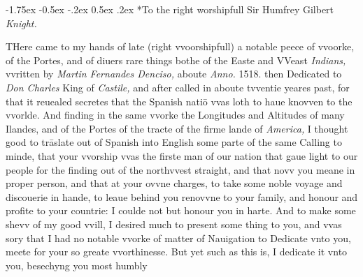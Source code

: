 \documentclass[11pt,twoside]{article}\makeatletter
\makeatletter
\renewcommand\section{\@startsection {section}{1}{\z@}%
     {-1.75ex \@plus -0.5ex \@minus -.2ex}%
     {0.5ex \@plus .2ex}%
     {\reset@font\Large\bfseries\sffamily}}
\makeatother
\begin{document}
\section*{To the right worshipfull Sir Humfrey Gilbert {\itshape Knight.}}\par
THere came to my hands of late (right vvoorshipfull) a notable peece of vvoorke, of the Portes, and of diuers rare things bothe of the Easte and VVeast {\itshape Indians,} vvritten by {\itshape Martin Fer­nandes Denciso,} aboute {\itshape Anno.} 1518. then Dedicated to {\itshape Don Charles} King of {\itshape Castile,} and after called in aboute tvventie yeares past, for that it reuealed secretes that the Spanish natiō vvas loth to haue knovven to the vvorlde. And finding in the same vvorke the Lon­gitudes and Altitudes of many Ilandes, and of the Portes of the tracte of the firme lande of {\itshape America,} I thought good to trāslate out of Spanish into English some parte of the same Calling to minde, that your vvorship vvas the firste man of our nation that gaue light to our people for the finding out of the north­vvest straight, and that novv you meane in proper person, and that at your ovvne charges, to take some noble voyage and discouerie in hande, to leaue be­hind you renovvne to your family, and honour and profite to your countrie: I coulde not but honour you in harte. And to make some shevv of my good vvill, I desired much to present some thing to you, and vvas sory that I had no notable vvorke of mat­ter of Nauigation to Dedicate vnto you, meete for your so greate vvorthinesse. But yet such as this is, I dedicate it vnto you, besechyng you most hum­bly %
\end{document}
